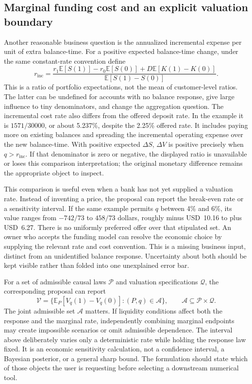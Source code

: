 \subsection{Marginal funding cost and an explicit valuation boundary}

Another reasonable business question is the annualized incremental expense
per unit of extra balance-time. For a positive expected balance-time change,
under the same constant-rate convention define
\begin{equation}
 r_{\mathrm{inc}}=
 \frac{r_1\mathbb E[S(1)]-r_0\mathbb E[S(0)]
       +D\mathbb E[K(1)-K(0)]}
      {\mathbb E[S(1)-S(0)]}.
 \label{exec17:l2-marginal}
\end{equation}
This is a ratio of portfolio expectations, not the mean of customer-level
ratios. The latter can be undefined for accounts with no balance response,
give large influence to tiny denominators, and change the aggregation
question. The incremental cost rate also differs from the offered deposit
rate. In the example it is $1571/30000$, or about 5.237\%, despite the
2.25\% offered rate. It includes paying more on existing balances and
spreading the incremental operating expense over the new balance-time.
With positive expected $\Delta S$, $\Delta V$ is positive precisely when
$q>r_{\mathrm{inc}}$. If that denominator is zero or negative, the displayed
ratio is unavailable or loses this comparison interpretation; the original
monetary difference remains the appropriate object to inspect.

This comparison is useful even when a bank has not yet supplied a valuation
rate. Instead of inventing a price, the proposal can report the break-even
rate or a sensitivity interval. If the same example permits $q$ between
4\% and 6\%, its value ranges from $-742/73$ to $458/73$ dollars, roughly
minus USD~10.16 to plus USD~6.27. There is no uniformly preferred offer over
that stipulated set. An owner who accepts the funding model can resolve
the economic choice by supplying the relevant rate and cost convention.
This is a missing business input, distinct from an unidentified balance
response. Uncertainty about both should be kept visible rather than folded
into one unexplained error bar.

For a set of admissible causal laws $\mathcal P$ and valuation specifications
$\mathcal Q$, the corresponding proposal can report
\begin{equation}
 \mathcal V=\{\mathbb E_P[V_q(1)-V_q(0)]:(P,q)\in\mathcal A\},
 \qquad \mathcal A\subseteq\mathcal P\times\mathcal Q.
 \label{exec17:l2-joint}
\end{equation}
The joint admissible set $\mathcal A$ matters. If liquidity conditions affect
both the response and the marginal rate, independently combining marginal
endpoints may create impossible scenarios or omit admissible dependence.
The interval above deliberately varies only a deterministic rate while
holding the response law fixed. It is an economic sensitivity calculation,
not a confidence interval, a Bayesian posterior, or a general sharp bound.
The formulation should state which of those objects the user is requesting
before selecting a downstream numerical tool.

